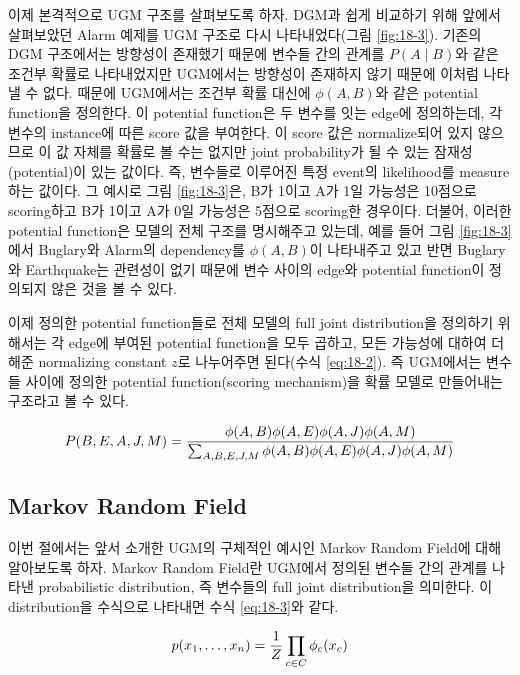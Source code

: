 \documentclass[draft=false]{oblivoir}
\begin{document}
이제 본격적으로 UGM 구조를 살펴보도록 하자. DGM과 쉽게 비교하기 위해 앞에서 살펴보았던 Alarm 예제를 UGM 구조로 다시 나타내었다(그림 \ref{fig:18-3}). 기존의 DGM 구조에서는 방향성이 존재했기 때문에 변수들 간의 관계를 $P(A\mid B)$와 같은 조건부 확률로 나타내었지만 UGM에서는 방향성이 존재하지 않기 때문에 이처럼 나타낼 수 없다. 때문에 UGM에서는 조건부 확률 대신에 $\phi(A,B)$와 같은 potential function을 정의한다. 이 potential function은 두 변수를 잇는 edge에 정의하는데, 각 변수의 instance에 따른 score 값을 부여한다. 이 score 값은 normalize되어 있지 않으므로 이 값 자체를 확률로 볼 수는 없지만 joint probability가 될 수 있는 잠재성(potential)이 있는 값이다. 즉, 변수들로 이루어진 특정 event의 likelihood를 measure하는 값이다. 그 예시로 그림 \ref{fig:18-3}은, B가 1이고 A가 1일 가능성은 10점으로 scoring하고 B가 1이고 A가 0일 가능성은 5점으로 scoring한 경우이다. 더불어, 이러한 potential function은 모델의 전체 구조를 명시해주고 있는데, 예를 들어 그림 \ref{fig:18-3}에서 Buglary와 Alarm의 dependency를 $\phi(A,B)$이 나타내주고 있고 반면 Buglary와 Earthquake는 관련성이 없기 때문에 변수 사이의 edge와 potential function이 정의되지 않은 것을 볼 수 있다. 

이제 정의한 potential function들로 전체 모델의 full joint distribution을 정의하기 위해서는 각 edge에 부여된 potential function을 모두 곱하고, 모든 가능성에 대하여 더해준 normalizing constant $z$로 나누어주면 된다(수식 \ref{eq:18-2}). 즉 UGM에서는 변수들 사이에 정의한 potential function(scoring mechanism)을 확률 모델로 만들어내는 구조라고 볼 수 있다.

\begin{equation}
	P(B,E,A,J,M) = {\phi(A,B)\phi(A,E)\phi(A,J)\phi(A,M) \over \sum_{A,B,E,J,M}\phi(A,B)\phi(A,E)\phi(A,J)\phi(A,M)}
\label{eq:18-2}
\end{equation}

\subsection{Markov Random Field}
이번 절에서는 앞서 소개한 UGM의 구체적인 예시인 Markov Random Field에 대해 알아보도록 하자. Markov Random Field란 UGM에서 정의된 변수들 간의 관계를 나타낸 probabilistic distribution, 즉 변수들의 full joint distribution을 의미한다. 이 distribution을 수식으로 나타내면 수식 \ref{eq:18-3}와 같다. 

\begin{equation}
	p(x_1,\dots, x_n) = {1 \over Z}\prod_{c\in C}\phi_c(x_c)
\label{eq:18-3}
\end{equation}
\end{document}

